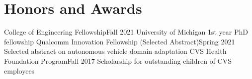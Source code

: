 \section{Honors and Awards}
  \CVSubHeadingListStart
    \CVSubheading
      {College of Engineering Fellowship}{Fall 2021}
      {University of Michigan 1st year PhD fellowship}{}
    \CVSubheading
      {Qualcomm Innovation Fellowship (Selected Abstract)}{Spring 2021}
      {Selected abstract on autonomous vehicle domain adaptation}{}
    \CVSubheading
      {CVS Health Foundation Program}{Fall 2017}
      {Scholarship for outstanding children of CVS employees}{}
  \CVSubHeadingListEnd